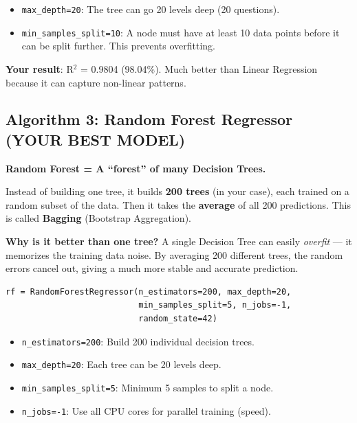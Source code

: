 \documentclass[12pt, a4paper]{article}
\begin{document}
\begin{itemize}
    \item \texttt{max\_depth=20}: The tree can go 20 levels deep (20 questions).
    \item \texttt{min\_samples\_split=10}: A node must have at least 10 data points before it can be split further. This prevents overfitting.
\end{itemize}

\textbf{Your result}: R$^2$ = 0.9804 (98.04\%). Much better than Linear Regression because it can capture non-linear patterns.


\subsection{Algorithm 3: Random Forest Regressor (YOUR BEST MODEL)}

\begin{conceptbox}
    \textbf{Random Forest = A ``forest'' of many Decision Trees.}

    Instead of building one tree, it builds \textbf{200 trees} (in your case), each trained on a random subset of the data. Then it takes the \textbf{average} of all 200 predictions. This is called \textbf{Bagging} (Bootstrap Aggregation).

    \vspace{0.3cm}
    \textbf{Why is it better than one tree?}
    A single Decision Tree can easily \textit{overfit} — it memorizes the training data noise. By averaging 200 different trees, the random errors cancel out, giving a much more stable and accurate prediction.
\end{conceptbox}

\begin{lstlisting}
rf = RandomForestRegressor(n_estimators=200, max_depth=20,
                           min_samples_split=5, n_jobs=-1,
                           random_state=42)
\end{lstlisting}

\begin{itemize}
    \item \texttt{n\_estimators=200}: Build 200 individual decision trees.
    \item \texttt{max\_depth=20}: Each tree can be 20 levels deep.
    \item \texttt{min\_samples\_split=5}: Minimum 5 samples to split a node.
    \item \texttt{n\_jobs=-1}: Use all CPU cores for parallel training (speed).
\end{itemize}
\end{document}

